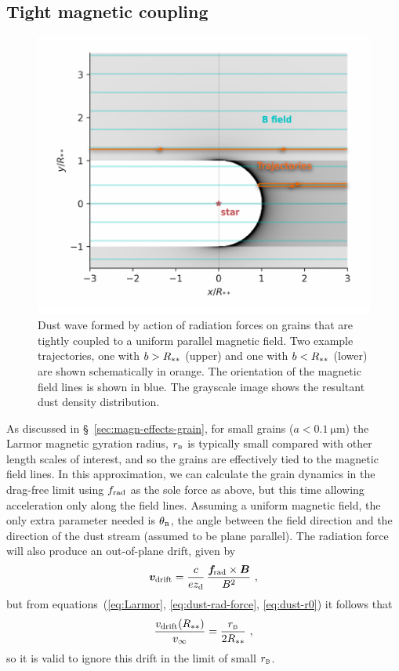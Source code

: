 \subsection{Tight magnetic coupling}
\label{sec:tight-magn-coupl}

\begin{figure}
  \centering
  \includegraphics[width=\linewidth]{figs/parallel-bfield-dust-wave-inertia}
  \caption{Dust wave formed by action of radiation forces on grains
    that are tightly coupled to a uniform parallel magnetic field.
    Two example trajectories, one with \(b > R_{**}\) (upper) and
    one with \(b < R_{**}\) (lower) are shown schematically in
    orange.  The orientation of the magnetic field lines is shown in
    blue.  The grayscale image shows the resultant dust density
    distribution.}
  \label{fig:inertia-thB0}
\end{figure}

As discussed in \S~\ref{sec:magn-effects-grain}, for small grains
(\(a < \SI{0.1}{\um}\)) the Larmor magnetic gyration radius, \(r_{\scriptscriptstyle\text{B}}\)
is typically small compared with other length scales of interest, and
so the grains are effectively tied to the magnetic field lines.  In
this approximation, we can calculate the grain dynamics in the
drag-free limit using \(f_{\text{rad}}\) as the sole force as above, but this
time allowing acceleration only along the field lines.  Assuming a
uniform magnetic field, the only extra parameter needed is
\(\theta_{\scriptscriptstyle\text{B}}\), the angle between the field direction and the direction of
the dust stream (assumed to be plane parallel).  The radiation force
will also produce an out-of-plane drift, given by
\begin{equation}
  \label{eq:perpendicular-drift}
  \bm{v}_{\text{drift}} = \frac{c}{e z_{\text{d}}} \, \frac{\bm{f}\!_{\text{rad}} \times \bm{B}}{B^2}
  \ ,
\end{equation}
but from equations~(\ref{eq:Larmor}, \ref{eq:dust-rad-force},
\ref{eq:dust-r0}) it follows that
\begin{equation}
  \label{eq:vdrift-over-vinfinity}
  \frac{v_{\text{drift}}(R_{**})}{v_\infty} = \frac{r_{\scriptscriptstyle\text{B}}}{2 R_{**}} \ ,
\end{equation}
so it is valid to ignore this drift in the limit of small \(r_{\scriptscriptstyle\text{B}}\).

